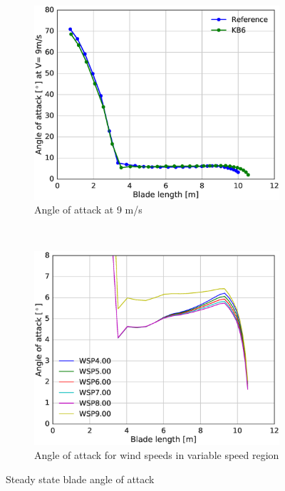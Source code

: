
\begin{figure}[tph]
\begin{subfigure}{0.50\textwidth}
\includegraphics[width=\linewidth]{figures/KB6_final/KB6_AoA_HS2.eps}
\caption{Angle of attack at 9 m/s}
\label{subfig:KB6_aoa_9}
\end{subfigure}
 ~
\begin{subfigure}{0.50\textwidth}
\includegraphics[width=\linewidth]{figures/KB6_final/KB6_AoA_WSP_HS2.eps}
\caption{Angle of attack for wind speeds in variable speed region}
\label{subfig:KB6_aoa_diffwsp}
\end{subfigure}
\caption{Steady state blade angle of attack}
\label{fig:KB6_aoa}
\end{figure}

